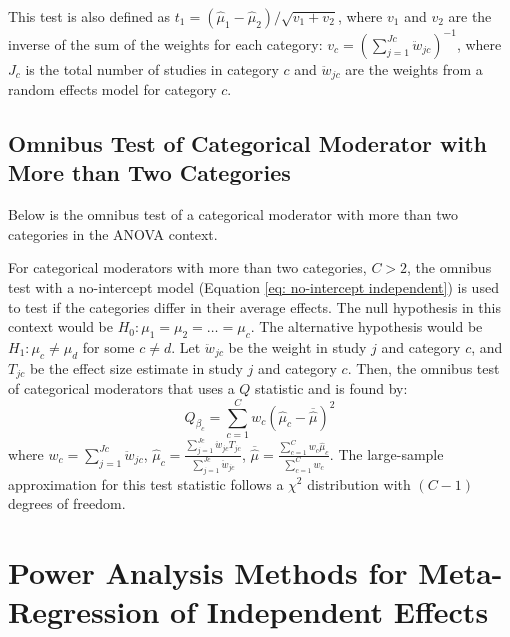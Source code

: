 
This test is also defined as $t_1 = (\hat{\mu}_1 - \hat{\mu}_2) / \sqrt{v_1 + v_2}$, where $v_1$ and $v_2$ are the inverse of the sum of the weights for each category: $v_c = (\sum_{j=1}^{Jc} \ddot{w}_{jc})^{-1}$, where $J_c$ is the total number of studies in category $c$ and $\ddot{w}_{jc}$ are the weights from a random effects model for category $c$.

\subsection{Omnibus Test of Categorical Moderator with More than Two Categories}

Below is the omnibus test of a categorical moderator with more than two categories in the ANOVA context.  

For categorical moderators with more than two categories, $C > 2$, the omnibus test with a no-intercept model (Equation \ref{eq: no-intercept independent}) is used to test if the categories differ in their average effects. The null hypothesis in this context would be $H_0: \mu_{1} = \mu_{2} = \hdots = \mu_{c}$. The alternative hypothesis would be $H_1: \mu_c \neq \mu_d$ for some $c \neq d$. Let $\ddot{w}_{jc}$ be the weight in study $j$ and category $c$, and $T_{jc}$ be the effect size estimate in study $j$ and category $c$. Then, the omnibus test of categorical moderators that uses a $Q$ statistic and is found by: 
\begin{equation} \label{eq: Qstat}
    Q_{\beta_c} = \sum_{c=1}^C w_c(\hat{\mu}_{c} - \overline{\hat{\mu}})^2 
\end{equation}
where $w_c = \sum_{j=1}^{Jc} \ddot{w}_{jc}$, $\hat{\mu}_c = \frac{\sum_{j=1}^{Jc} \ddot{w}_{jc} T_{jc}}{\sum_{j=1}^{Jc} \ddot{w}_{jc}}$, $\overline{\hat{\mu}} = \frac{\sum_{c=1}^C w_c \hat{\mu}_c}{\sum_{c=1}^C w_c}$. The large-sample approximation for this test statistic follows a $\chi^2$ distribution with $(C-1)$ degrees of freedom.

\section{Power Analysis Methods for Meta-Regression of Independent Effects}

